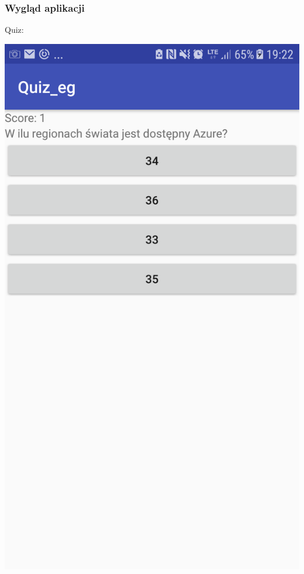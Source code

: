 \documentclass[11pt]{beamer}
\begin{document}
\begin{frame}
\frametitle{Wygląd aplikacji}
Quiz:
\begin{center}
\includegraphics[scale=0.2]{../imgs/Quiz2_screenshot.png}
\end{center}
\end{frame}
\end{document}
